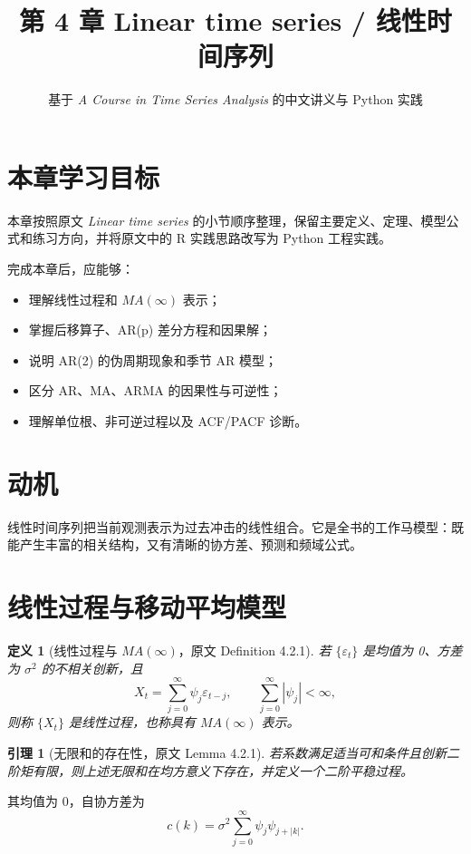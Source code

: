 \documentclass[11pt,a4paper]{ctexart}
\title{第 4 章 \quad Linear time series / 线性时间序列}
\author{基于 \textit{A Course in Time Series Analysis} 的中文讲义与 Python 实践}
\date{}
\newtheorem{definition}{定义}[section]
\newtheorem{lemma}{引理}[section]
\begin{document}
\maketitle

\section*{本章学习目标}

本章按照原文 \textit{Linear time series} 的小节顺序整理，保留主要定义、定理、模型公式和练习方向，并将原文中的 R 实践思路改写为 Python 工程实践。

完成本章后，应能够：
\begin{itemize}
  \item 理解线性过程和 \(MA(\infty)\) 表示；
  \item 掌握后移算子、AR(p) 差分方程和因果解；
  \item 说明 AR(2) 的伪周期现象和季节 AR 模型；
  \item 区分 AR、MA、ARMA 的因果性与可逆性；
  \item 理解单位根、非可逆过程以及 ACF/PACF 诊断。
\end{itemize}

\section{动机}

线性时间序列把当前观测表示为过去冲击的线性组合。它是全书的工作马模型：既能产生丰富的相关结构，又有清晰的协方差、预测和频域公式。

\section{线性过程与移动平均模型}

\begin{definition}[线性过程与 \(MA(\infty)\)，原文 Definition 4.2.1]
若 \(\{\varepsilon_t\}\) 是均值为 0、方差为 \(\sigma^2\) 的不相关创新，且
\[
  X_t=\sum_{j=0}^{\infty}\psi_j\varepsilon_{t-j},
  \qquad \sum_{j=0}^{\infty}|\psi_j|<\infty,
\]
则称 \(\{X_t\}\) 是线性过程，也称具有 \(MA(\infty)\) 表示。
\end{definition}

\begin{lemma}[无限和的存在性，原文 Lemma 4.2.1]
若系数满足适当可和条件且创新二阶矩有限，则上述无限和在均方意义下存在，并定义一个二阶平稳过程。
\end{lemma}

其均值为 0，自协方差为
\[
  c(k)=\sigma^2\sum_{j=0}^{\infty}\psi_j\psi_{j+|k|}.
\]
\end{document}
